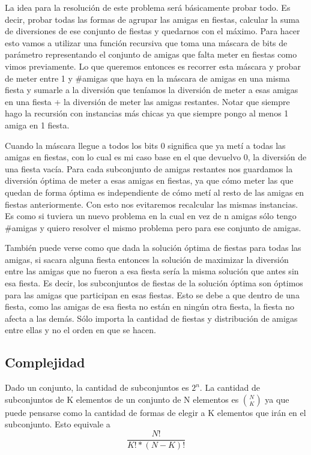 La idea para la resolución de este problema será básicamente probar todo. Es decir, probar todas las formas de agrupar las amigas en fiestas, calcular la suma de diversiones de ese conjunto de fiestas y quedarnos con el máximo. Para hacer esto vamos a utilizar una función recursiva que toma una máscara de bits de parámetro representando el conjunto de amigas que falta meter en fiestas como vimos previamente. Lo que queremos entonces es recorrer esta máscara y probar de meter entre 1 y \#amigas que haya en la máscara de amigas en una misma fiesta y sumarle a la diversión que teníamos la diversión de meter a esas amigas en una fiesta + la diversión de meter las amigas restantes. Notar que siempre hago la recursión con instancias más chicas ya que siempre pongo al menos 1 amiga en 1 fiesta. \newline


Cuando la máscara llegue a todos los bits 0 significa que ya metí a todas las amigas en fiestas, con lo cual es mi caso base en el que devuelvo 0, la diversión de una fiesta vacía. Para cada subconjunto de amigas restantes nos guardamos la diversión óptima de meter a esas amigas en fiestas, ya que cómo meter las que quedan de forma óptima es independiente de cómo metí al resto de las amigas en fiestas anteriormente. Con esto nos evitaremos recalcular las mismas instancias. Es como si tuviera un nuevo problema en la cual en vez de n amigas sólo tengo \#amigas y quiero resolver el mismo problema pero para ese conjunto de amigas.

También puede verse como que dada la solución óptima de fiestas para todas las amigas, si sacara alguna fiesta entonces la solución de maximizar la diversión entre las amigas que no fueron a esa fiesta sería la misma solución que antes sin esa fiesta. Es decir, los subconjuntos de fiestas de la solución óptima son óptimos para las amigas que participan en esas fiestas. Esto se debe a que dentro de una fiesta, como las amigas de esa fiesta no están en ningún otra fiesta, la fiesta no afecta a las demás. Sólo importa la cantidad de fiestas y distribución de amigas entre ellas y no el orden en que se hacen.


\subsection{Complejidad}

Dado un conjunto, la cantidad de subconjuntos es $2^{n}$. La cantidad de subconjuntos de K elementos de un conjunto de N elementos es $\binom{N}{K}$ ya que puede pensarse como la cantidad de formas de elegir a K elementos que irán en el subconjunto. Esto equivale a \[ \dfrac{N!}{K! * (N - K)!} \] \newline


